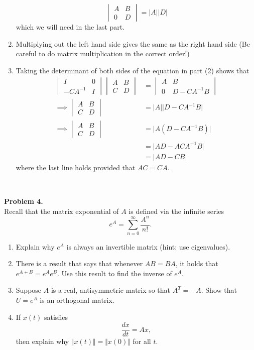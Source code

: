 \documentclass[11pt]{article}
\begin{document}
\begin{enumerate}
$$\begin{vmatrix} A & B \\ 0 & D \end{vmatrix} = \vert A \vert \vert D \vert$$
which we will need in the last part.
\item Multiplying out the left hand side gives the same as the right hand side (Be careful to do matrix multiplication in the correct order!)
\item Taking the determinant of both sides of the equation in part (2) shows that
\begin{align*}
\begin{vmatrix} I & 0 \\ -CA^{-1} & I \end{vmatrix} \begin{vmatrix} A & B \\ C & D \end{vmatrix}  &= \begin{vmatrix} A & B \\ 0 & D-CA^{-1} B\end{vmatrix} \\
\implies \begin{vmatrix} A & B \\ C & D \end{vmatrix} & = \vert A \vert \vert D-CA^{-1} B \vert \\
\implies \begin{vmatrix} A & B \\ C & D \end{vmatrix} & = \vert A \left(D-CA^{-1} B\right) \vert \\
&= \vert AD - ACA^{-1}B \vert\\
&= \vert AD - CB \vert
\end{align*}
where the last line holds provided that $AC=CA$. 
\end{enumerate}

\

\noindent \textbf{Problem 4.}\\
Recall that the matrix exponential of $A$ is defined via the infinite series
$$e^A = \sum_{n=0}^{\infty} \frac{A^n}{n!}.$$
\begin{enumerate}
\item Explain why $e^A$ is always an invertible matrix (hint: use eigenvalues). 
\item There is a result that says that whenever $AB=BA$, it holds that $e^{A+B}=e^{A}e^{B}$. Use this result to find the inverse of $e^{A}$. 
\item Suppose $A$ is a real, antisymmetric matrix so that $A^T=-A$. Show that $U= e^A$ is an orthogonal matrix.
\item If $x(t)$ satisfies 
$$\frac{dx}{dt} = Ax,$$
then explain why $\Vert x(t) \Vert = \Vert x(0) \Vert$ for all $t$.
\end{enumerate}
\end{document}
